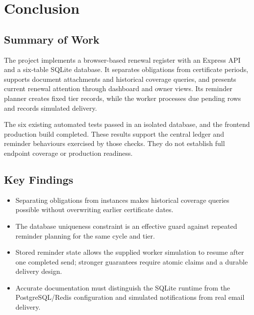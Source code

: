 \chapter{Conclusion}
\section{Summary of Work}
The project implements a browser-based renewal register with an Express API and a six-table SQLite database. It separates obligations from certificate periods, supports document attachments and historical coverage queries, and presents current renewal attention through dashboard and owner views. Its reminder planner creates fixed tier records, while the worker processes due pending rows and records simulated delivery.

The six existing automated tests passed in an isolated database, and the frontend production build completed. These results support the central ledger and reminder behaviours exercised by those checks. They do not establish full endpoint coverage or production readiness.

\section{Key Findings}
\begin{itemize}
\item Separating obligations from instances makes historical coverage queries possible without overwriting earlier certificate dates.
\item The database uniqueness constraint is an effective guard against repeated reminder planning for the same cycle and tier.
\item Stored reminder state allows the supplied worker simulation to resume after one completed send; stronger guarantees require atomic claims and a durable delivery design.
\item Accurate documentation must distinguish the SQLite runtime from the PostgreSQL/Redis configuration and simulated notifications from real email delivery.
\end{itemize}

